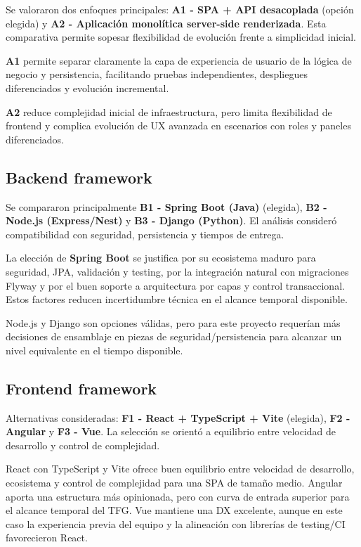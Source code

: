 Se valoraron dos enfoques principales: \textbf{A1 - SPA + API desacoplada} (opci\'on elegida) y \textbf{A2 - Aplicaci\'on monol\'itica server-side renderizada}. Esta comparativa permite sopesar flexibilidad de evoluci\'on frente a simplicidad inicial.

\textbf{A1} permite separar claramente la capa de experiencia de usuario
de la l\'ogica de negocio y persistencia, facilitando pruebas independientes,
despliegues diferenciados y evoluci\'on incremental.

\textbf{A2} reduce complejidad inicial de infraestructura,
pero limita flexibilidad de frontend y complica evoluci\'on de UX avanzada
en escenarios con roles y paneles diferenciados.

\subsection{Backend framework}

Se compararon principalmente \textbf{B1 - Spring Boot (Java)} (elegida), \textbf{B2 - Node.js (Express/Nest)} y \textbf{B3 - Django (Python)}. El an\'alisis consider\'o compatibilidad con seguridad, persistencia y tiempos de entrega.

La elecci\'on de \textbf{Spring Boot} se justifica por su ecosistema maduro para seguridad, JPA, validaci\'on y testing, por la integraci\'on natural con migraciones Flyway y por el buen soporte a arquitectura por capas y control transaccional. Estos factores reducen incertidumbre t\'ecnica en el alcance temporal disponible.

Node.js y Django son opciones v\'alidas,
pero para este proyecto requer\'ian m\'as decisiones de ensamblaje
en piezas de seguridad/persistencia para alcanzar un nivel equivalente
en el tiempo disponible.

\subsection{Frontend framework}

Alternativas consideradas: \textbf{F1 - React + TypeScript + Vite} (elegida), \textbf{F2 - Angular} y \textbf{F3 - Vue}. La selecci\'on se orient\'o a equilibrio entre velocidad de desarrollo y control de complejidad.

React con TypeScript y Vite ofrece buen equilibrio entre velocidad de desarrollo,
ecosistema y control de complejidad para una SPA de tama\~no medio.
Angular aporta una estructura m\'as opinionada,
pero con curva de entrada superior para el alcance temporal del TFG.
Vue mantiene una DX excelente, aunque en este caso la experiencia previa del equipo
y la alineaci\'on con librer\'ias de testing/CI favorecieron React.

